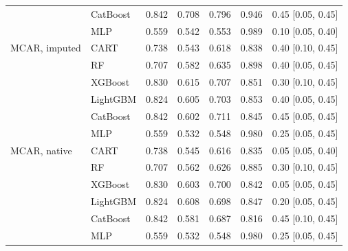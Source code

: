 \begin{table}[p]
\begin{tabular}{@{}llrrrrl@{}}
 & CatBoost & 0.842 & 0.708 & 0.796 & 0.946 & 0.45 [0.05, 0.45] \\
 & MLP & 0.559 & 0.542 & 0.553 & 0.989 & 0.10 [0.05, 0.40] \\
\midrule
MCAR, imputed & CART & 0.738 & 0.543 & 0.618 & 0.838 & 0.40 [0.10, 0.45] \\
 & RF & 0.707 & 0.582 & 0.635 & 0.898 & 0.40 [0.05, 0.45] \\
 & XGBoost & 0.830 & 0.615 & 0.707 & 0.851 & 0.30 [0.10, 0.45] \\
 & LightGBM & 0.824 & 0.605 & 0.703 & 0.853 & 0.40 [0.05, 0.45] \\
 & CatBoost & 0.842 & 0.602 & 0.711 & 0.845 & 0.45 [0.05, 0.45] \\
 & MLP & 0.559 & 0.532 & 0.548 & 0.980 & 0.25 [0.05, 0.45] \\
\midrule
MCAR, native & CART & 0.738 & 0.545 & 0.616 & 0.835 & 0.05 [0.05, 0.40] \\
 & RF & 0.707 & 0.562 & 0.626 & 0.885 & 0.30 [0.10, 0.45] \\
 & XGBoost & 0.830 & 0.603 & 0.700 & 0.842 & 0.05 [0.05, 0.45] \\
 & LightGBM & 0.824 & 0.608 & 0.698 & 0.847 & 0.20 [0.05, 0.45] \\
 & CatBoost & 0.842 & 0.581 & 0.687 & 0.816 & 0.45 [0.10, 0.45] \\
 & MLP & 0.559 & 0.532 & 0.548 & 0.980 & 0.25 [0.05, 0.45] \\
\bottomrule
\end{tabular}
\end{table}

